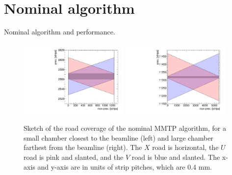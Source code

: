 \section{Nominal algorithm}
\label{sec:nominal}

Nominal algorithm and performance.

\begin{figure}[!htpb]
  \begin{center}
    \includegraphics[width=0.48\textwidth]{figures/cartoon_roads_small_nominal.pdf}
    \includegraphics[width=0.48\textwidth]{figures/cartoon_roads_large_nominal.pdf}
  \end{center}
  \vspace{-10pt}
  \caption{Sketch of the road coverage of the nominal MMTP algorithm, for a small chamber closest to the beamline (left) and large chamber farthest from the beamline (right). The $X$ road is horizontal, the $U$ road is pink and slanted, and the $V$ road is blue and slanted. The x-axis and y-axis are in units of strip pitches, which are 0.4 mm.}
  \label{fig:cartoon_nominal}
\end{figure}

